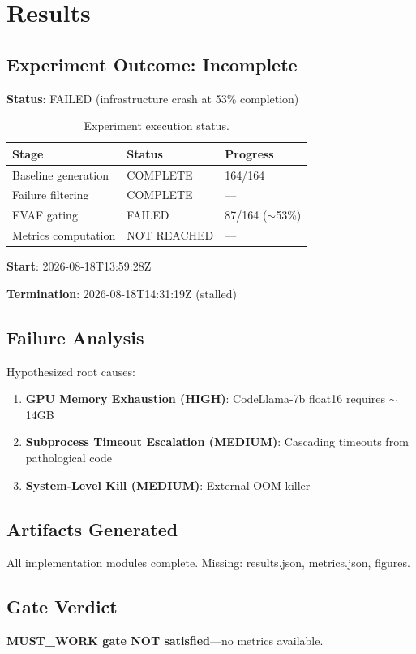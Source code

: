 \section{Results}
\label{sec:results}

\subsection{Experiment Outcome: Incomplete}

\textbf{Status}: FAILED (infrastructure crash at 53\% completion)

\begin{table}[h]
\centering
\begin{tabular}{lll}
\toprule
\textbf{Stage} & \textbf{Status} & \textbf{Progress} \\
\midrule
Baseline generation & COMPLETE & 164/164 \\
Failure filtering & COMPLETE & --- \\
EVAF gating & FAILED & 87/164 ($\sim$53\%) \\
Metrics computation & NOT REACHED & --- \\
\bottomrule
\end{tabular}
\caption{Experiment execution status.}
\label{tab:status}
\end{table}

\textbf{Start}: 2026-08-18T13:59:28Z

\textbf{Termination}: 2026-08-18T14:31:19Z (stalled)

\subsection{Failure Analysis}

Hypothesized root causes:
\begin{enumerate}
    \item \textbf{GPU Memory Exhaustion (HIGH)}: CodeLlama-7b float16 requires $\sim$14GB
    \item \textbf{Subprocess Timeout Escalation (MEDIUM)}: Cascading timeouts from pathological code
    \item \textbf{System-Level Kill (MEDIUM)}: External OOM killer
\end{enumerate}

\subsection{Artifacts Generated}

All implementation modules complete. Missing: results.json, metrics.json, figures.

\subsection{Gate Verdict}

\textbf{MUST\_WORK gate NOT satisfied}---no metrics available.

